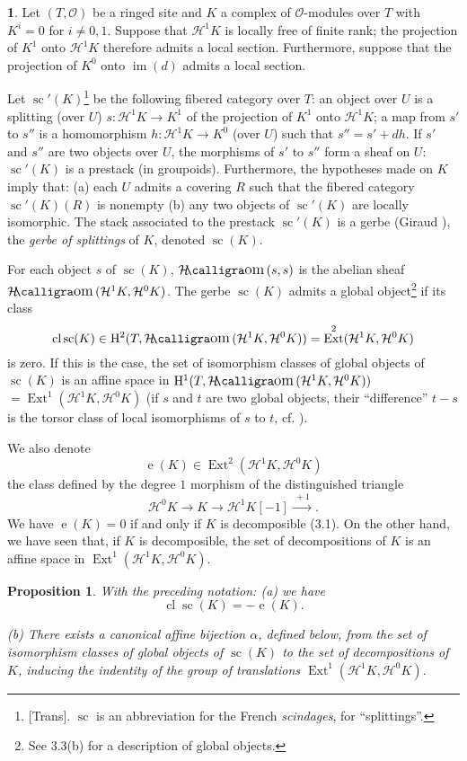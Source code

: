 \documentclass[10pt,reqno]{article}
\renewcommand{\H}{\mathrm{H}}
\newcommand{\HH}{\mathcal{H}}
\renewcommand{\O}{\mathcal{O}}
\DeclareMathOperator{\Ext}{Ext}
\DeclareMathOperator{\Sc}{sc}
\DeclareMathOperator{\Cl}{cl}
\DeclareMathOperator{\e}{e}
\DeclareMathOperator{\SHom}{\mathcal{H}\text{\kern -3pt {\calligra\large om}}\,}
\theoremstyle{plain}
\newtheorem{prop}[thm]{Proposition}
\theoremstyle{definition}
\newtheorem{blk}[thm]{}
\begin{document}
\begin{blk}
Let $(T,\O)$ be a ringed site and $K$ a complex of $\O$-modules over $T$ with $K^i=0$ for $i\neq 0,1$. Suppose
that $\HH^1 K$ is locally free of finite rank; the projection of $K^1$ onto $\HH^1 K$ therefore admits a local
section. Furthermore, suppose that the projection of $K^0$ onto $\operatorname{im}(d)$ admits a local section.

Let $\Sc'(K)$\footnote{[Trans]. $\Sc$ is an abbreviation for the French \emph{scindages}, for ``splittings''.}
be the following fibered category over $T$: an object over $U$ is a splitting (over $U$)
$s:\HH^1 K\to K^1$ of the projection of $K^1$ onto $\HH^1 K$; a map from $s'$ to $s''$ is a homomorphism
$h:\HH^1 K\to K^0$ (over $U$) such that $s''=s'+dh$. If $s'$ and $s''$ are two objects over $U$, the morphisms
of $s'$ to $s''$ form a sheaf on $U$: $\Sc'(K)$ is a prestack (in groupoids). Furthermore, the hypotheses made
on $K$ imply that: (a) each $U$ admits a covering $R$ such that the fibered category $\Sc'(K)(R)$ is nonempty
(b) any two objects of $\Sc'(K)$ are locally isomorphic. The stack associated to the prestack $\Sc'(K)$ is
a gerbe (Giraud \cite[III~\textsection~2]{12}), the \emph{gerbe of splittings} of $K$, denoted $\Sc(K)$.

For each object $s$ of $\Sc(K)$, $\SHom(s,s)$ is the abelian sheaf $\SHom(\HH^1 K,\HH^0 K)$. The gerbe
$\Sc(K)$ admits a global object\footnote{See 3.3(b) for a description of global objects.} if its class
\cite[IV~3.1,~3.5]{12}
\[
  \Cl\Sc(K)\in\H^2(T,\SHom(\HH^1 K,\HH^0 K))=\Ext^2(\HH^1 K,\HH^0 K)
\]
is zero. If this is the case, the set of isomorphism classes of global objects of $\Sc(K)$ is an affine space
in $\H^1(T,\SHom(\HH^1 K,\HH^0 K))$ $=\Ext^1(\HH^1 K,\HH^0 K)$ (if $s$ and $t$ are two global objects, their
``difference'' $t-s$ is the torsor class of local isomorphisms of $s$ to $t$, cf. \cite[III~2.2.6]{12}).

We also denote
\[
  \e(K)\in\Ext^2(\HH^1 K,\HH^0 K)
\]
the class defined by the degree $1$ morphism of the distinguished triangle
\[
  \HH^0 K\longrightarrow K\longrightarrow\HH^1 K[-1]\xrightarrow{\ +1\ }.
\]
We have $\e(K)=0$ if and only if $K$ is decomposible (3.1). On the other hand, we have seen that, if $K$
is decomposible, the set of decompositions of $K$ is an affine space in $\Ext^1(\HH^1 K,\HH^0 K)$.
\end{blk}

\begin{prop}
With the preceding notation: \emph{(a)} we have
\[
  \Cl\Sc(K)=-\e(K).
\]

\emph{(b)} There exists a canonical affine bijection $\alpha$, defined below, from the set of isomorphism
classes of global objects of $\Sc(K)$ to the set of decompositions of $K$, inducing the indentity of
the group of translations $\Ext^1(\HH^1 K,\HH^0 K)$.
\end{prop}
\end{document}
